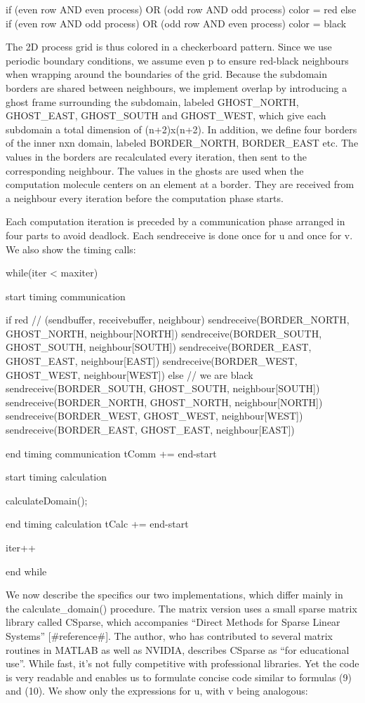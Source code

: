 \documentclass[a4paper,11pt]{article}
\begin{document}
if (even row AND even process) OR (odd row AND odd process)
  color = red
else if (even row AND odd process) OR (odd row AND even process)
  color = black

The 2D process grid is thus colored in a checkerboard pattern. Since we use periodic boundary conditions, we assume even p to ensure red-black neighbours when wrapping around the boundaries of the grid. Because the subdomain borders are shared between neighbours, we implement overlap by introducing a ghost frame surrounding the subdomain, labeled GHOST_NORTH, GHOST_EAST, GHOST_SOUTH and GHOST_WEST, which give each subdomain a total dimension of (n+2)x(n+2). In addition, we define four borders of the inner nxn domain, labeled BORDER_NORTH, BORDER_EAST etc. The values in the borders are recalculated every iteration, then sent to the corresponding neighbour. The values in the ghosts are used when the computation molecule centers on an element at a border. They are received from a neighbour every iteration before the computation phase starts.

Each computation iteration is preceded by a communication phase arranged in four parts to avoid deadlock. Each sendreceive is done once for u and once for v. We also show the timing calls:

while(iter < maxiter)

  start timing communication

  if red
    // (sendbuffer, receivebuffer, neighbour)
    sendreceive(BORDER_NORTH, GHOST_NORTH, neighbour[NORTH])  
    sendreceive(BORDER_SOUTH, GHOST_SOUTH, neighbour[SOUTH])
    sendreceive(BORDER_EAST, GHOST_EAST, neighbour[EAST]) 
    sendreceive(BORDER_WEST, GHOST_WEST, neighbour[WEST]) 
  else
    // we are black
    sendreceive(BORDER_SOUTH, GHOST_SOUTH, neighbour[SOUTH])
    sendreceive(BORDER_NORTH, GHOST_NORTH, neighbour[NORTH])  
    sendreceive(BORDER_WEST, GHOST_WEST, neighbour[WEST])
    sendreceive(BORDER_EAST, GHOST_EAST, neighbour[EAST])
        
  end timing communication
  tComm += end-start

  start timing calculation    

  calculateDomain();

  end timing calculation
  tCalc += end-start

  iter++

end while

We now describe the specifics our two implementations, which differ mainly in the calculate_domain() procedure. The matrix version uses a small sparse matrix library called CSparse, which accompanies ``Direct Methods for Sparse Linear Systems'' [#reference#]. The author, who has contributed to several matrix routines in MATLAB as well as NVIDIA, describes CSparse as ``for educational use''. While fast, it's not fully competitive with professional libraries. Yet the code is very readable and enables us to formulate concise code similar to formulas (9) and (10). We show only the expressions for u, with v being analogous:
\end{document}
